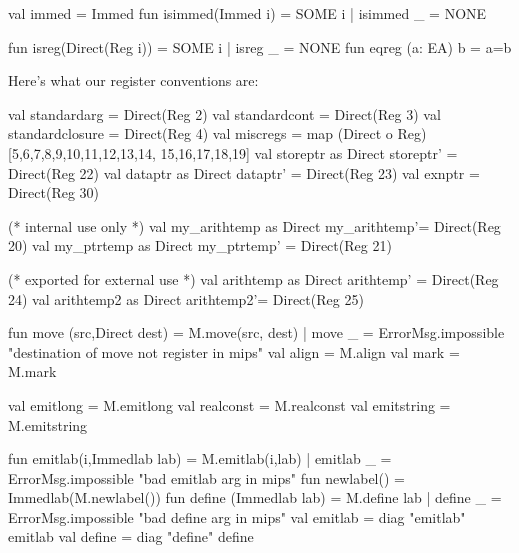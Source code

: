 \endcode
{}
\endmoddef
val immed = Immed
fun isimmed(Immed i) = SOME i
  | isimmed _ = NONE

fun isreg(Direct(Reg i)) = SOME i | isreg _ = NONE
fun eqreg (a: EA) b = a=b


\endcode
{}
Here's what our register conventions are:

\enddocs
{}
\endmoddef
val standardarg = Direct(Reg 2)
val standardcont = Direct(Reg 3)
val standardclosure = Direct(Reg 4)
val miscregs = map (Direct o Reg) [5,6,7,8,9,10,11,12,13,14,
                                   15,16,17,18,19]
val storeptr as Direct storeptr' = Direct(Reg 22)
val dataptr  as Direct dataptr'  = Direct(Reg 23)
val exnptr = Direct(Reg 30)

  (* internal use only *)
val my_arithtemp as Direct my_arithtemp'= Direct(Reg 20) 
val my_ptrtemp as Direct my_ptrtemp' = Direct(Reg 21)

  (* exported for external use *)
val arithtemp as Direct arithtemp' = Direct(Reg 24) 
val arithtemp2 as Direct arithtemp2'= Direct(Reg 25)

\endcode
{}
\endmoddef
fun move (src,Direct dest) = M.move(src, dest)
  | move _ = ErrorMsg.impossible "destination of move not register in mips"
\endcode
{}
\endmoddef
val align = M.align
val mark = M.mark

val emitlong = M.emitlong
val realconst = M.realconst
val emitstring = M.emitstring

\endcode
{}
\endmoddef
fun emitlab(i,Immedlab lab) = M.emitlab(i,lab)
  | emitlab _ = ErrorMsg.impossible "bad emitlab arg in mips"
fun newlabel() = Immedlab(M.newlabel())
fun define (Immedlab lab) = M.define lab
  | define _ = ErrorMsg.impossible "bad define arg in mips"
\endcode
{}
\endmoddef
val emitlab = diag "emitlab" emitlab
val define = diag "define" define


